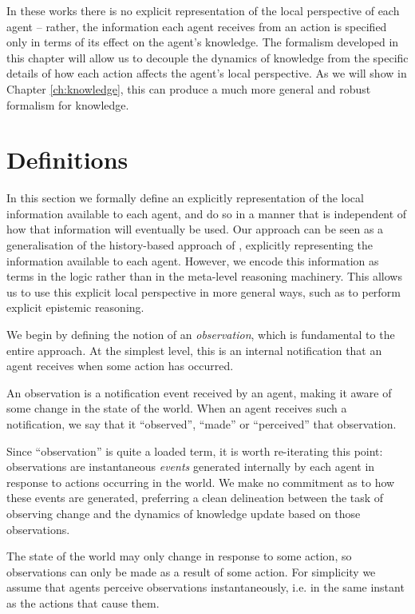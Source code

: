 In these works there is no explicit representation of the local perspective
of each agent -- rather, the information each agent receives from
an action is specified only in terms of its effect on the agent's
knowledge. The formalism developed in this chapter will allow us to
decouple the dynamics of knowledge from the specific details of how
each action affects the agent's local perspective. As we will show
in Chapter \ref{ch:knowledge}, this can produce a much more general
and robust formalism for knowledge.


\section{Definitions\label{sec:Observations:Definitions}}

In this section we formally define an explicitly representation of
the local information available to each agent, and do so in a manner
that is independent of how that information will eventually be used.
Our approach can be seen as a generalisation of the history-based
approach of \citep{giacomo99indigolog}, explicitly representing the
information available to each agent. However, we encode this information
as terms in the logic rather than in the meta-level reasoning machinery.
This allows us to use this explicit local perspective in more general
ways, such as to perform explicit epistemic reasoning.

We begin by defining the notion of an \emph{observation}, which is
fundamental to the entire approach\emph{.} At the simplest level,
this is an internal notification that an agent receives when some
action has occurred.

\begin{defnL}
[{Observations}] An observation is a notification event received
by an agent, making it aware of some change in the state of the world.
When an agent receives such a notification, we say that it {}``observed'',
{}``made'' or {}``perceived'' that observation. 
\end{defnL}
Since {}``observation'' is quite a loaded term, it is worth re-iterating
this point: observations are instantaneous \emph{events} generated
internally by each agent in response to actions occurring in the world.
We make no commitment as to how these events are generated, preferring
a clean delineation between the task of observing change and the dynamics
of knowledge update based on those observations.

The state of the world may only change in response to some action,
so observations can only be made as a result of some action. For simplicity
we assume that agents perceive observations instantaneously, i.e.
in the same instant as the actions that cause them.

